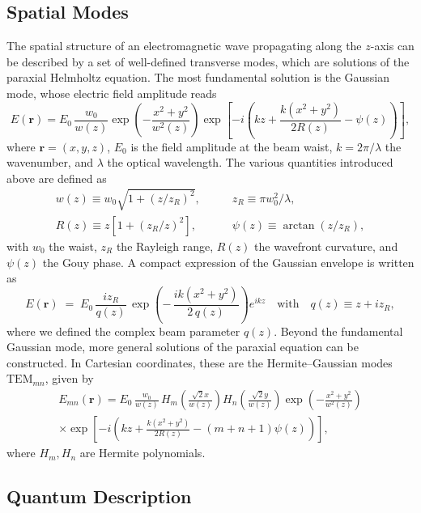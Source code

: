 \subsection{Spatial Modes}
The spatial structure of an electromagnetic wave propagating along the $z$-axis can be described by a set of well-defined transverse modes, which are solutions of the paraxial Helmholtz equation. The most fundamental solution is the Gaussian mode, whose electric field amplitude reads
\begin{equation}
E(\mathbf r) = E_0 \, \frac{w_0}{w(z)} 
\exp\!\left(-\frac{x^2+y^2}{w^2(z)}\right) 
\exp\!\left[-i\!\left(kz + \frac{k(x^2+y^2)}{2R(z)} - \psi(z)\right)\right],
\end{equation}
where $\mathbf r = (x, y, z)$, $E_0$ is the field amplitude at the beam waist, $k = 2\pi/\lambda$ the wavenumber, and $\lambda$ the optical wavelength. The various quantities introduced above are defined as
\begin{equation*}
  \begin{split}
w(z) \equiv w_0 \sqrt{1+(z/z_R)^2}, \quad & \quad
z_R \equiv \pi w_0^2/\lambda, \\
R(z) \equiv z\left[1+(z_R/z)^2\right], \quad &\quad
\psi(z) \equiv \arctan(z/z_R),
  \end{split}
\end{equation*}
with $w_0$ the waist, $z_R$ the Rayleigh range, $R(z)$ the wavefront curvature, and $\psi(z)$ the Gouy phase. 
A compact expression of the Gaussian envelope is written as
\begin{equation}
E(\mathbf r) \;=\; E_0 \,\frac{i z_R}{q(z)} \,
\exp\!\left(-\,\frac{i k (x^2+y^2)}{2\,q(z)}\right) e^{i k z}  \quad  \text{with} \quad q(z) \equiv z + i z_R,
\label{II.1}
\end{equation}
where we defined the complex beam parameter $q(z)$. 
Beyond the fundamental Gaussian mode, more general solutions of the paraxial equation can be constructed. In Cartesian coordinates, these are the Hermite--Gaussian modes $\mathrm{TEM}_{mn}$, given by
\begin{multline}
E_{mn}(\mathbf{r}) = E_0 \, \frac{w_0}{w(z)} \,
H_m\!\left(\frac{\sqrt{2}x}{w(z)}\right) 
H_n\!\left(\frac{\sqrt{2}y}{w(z)}\right) 
\exp\!\left(-\frac{x^2+y^2}{w^2(z)}\right) \\
\times \exp\!\left[-i\!\left(kz + \frac{k(x^2+y^2)}{2R(z)} - (m+n+1)\psi(z)\right)\right],
\end{multline}
where $H_m, H_n$ are Hermite polynomials. 
\subsection{Quantum Description}

